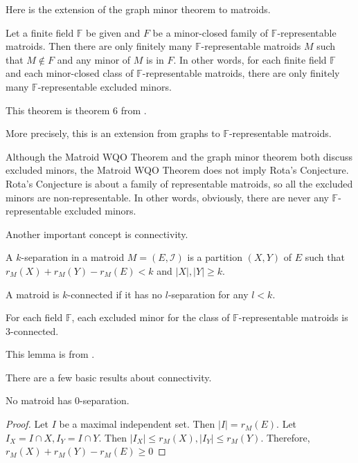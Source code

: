 Here is the extension of the graph minor theorem to matroids.

\begin{thm} 
Let a finite field $\mathbb{F}$ be given and $F$ be a minor-closed family of $\mathbb{F}$-representable matroids.
Then there are only finitely many $\mathbb{F}$-representable matroids $M$ such that $M \notin F$ and any minor of $M$ is in $F$.
In other words, for each finite field $\mathbb{F}$ and each minor-closed class of $\mathbb{F}$-representable matroids, there are only finitely many $\mathbb{F}$-representable excluded minors.
\end{thm}

This theorem is theorem 6 from \cite{solving}.

More precisely, this is an extension from graphs to $\mathbb{F}$-representable matroids.

Although the Matroid WQO Theorem and the graph minor theorem both discuss excluded minors, the Matroid WQO Theorem does not imply Rota's Conjecture.
Rota's Conjecture is about a family of representable matroids, so all the excluded minors are non-representable.
In other words, obviously, there are never any $\mathbb{F}$-representable excluded minors.

%

Another important concept is connectivity.
\begin{defn}
A $k$-separation in a matroid $M = (E, \mathcal{I})$ is a partition $(X, Y)$ of $E$ such that $r_M(X) + r_M(Y) - r_M(E) < k$ and $\lvert X \rvert, \lvert Y \rvert \geq k$.
\end{defn}
\begin{defn}
A matroid is $k$-connected if it has no $l$-separation for any $l < k$.
\end{defn}

\begin{lem}
For each field $\mathbb{F}$, each excluded minor for the class of $\mathbb{F}$-representable matroids is 3-connected.
\end{lem}

This lemma is from \cite{solving}.

There are a few basic results about connectivity.

\begin{thm}
No matroid has 0-separation.
\end{thm}
\begin{proof}
Let $I$ be a maximal independent set.
Then $\lvert I \rvert = r_M(E)$.
Let $I_X = I \cap X, I_Y = I \cap Y$.
Then $\lvert I_X \rvert \leq r_M(X), \lvert I_Y \rvert \leq r_M(Y)$.
Therefore, $r_M(X) + r_M(Y) - r_M(E) \geq 0$
\end{proof}


